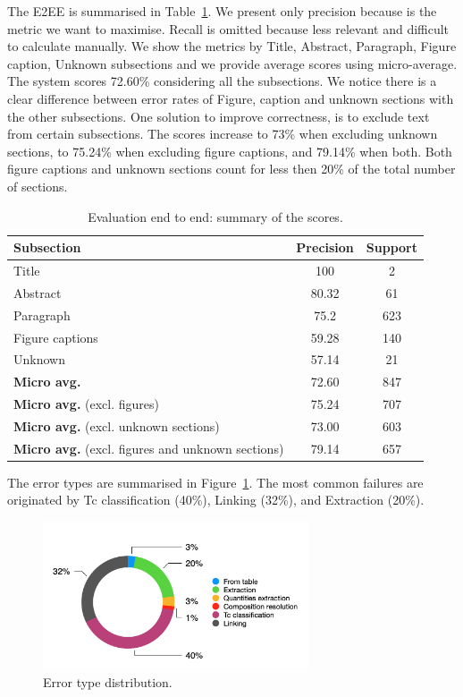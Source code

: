 \documentclass{article}
\begin{document}
The E2EE is summarised in Table~\ref{table:end2end-evaluation-summary}. 
We present only precision because is the metric we want to maximise. Recall is omitted because less relevant and difficult to calculate manually. 
We show the metrics by Title, Abstract, Paragraph, Figure caption, Unknown subsections and we provide average scores using micro-average. 
The system scores 72.60\% considering all the subsections. 
We notice there is a clear difference between error rates of Figure, caption and unknown sections with the other subsections. 
One solution to improve correctness, is to exclude text from certain subsections. 
The scores increase to 73\% when excluding unknown sections, to 75.24\% when excluding figure captions, and 79.14\%  when both. 
Both figure captions and unknown sections count for less then 20\% of the total number of sections. 


\begin{table}[ht]
\centering\small
\begin{tabular}{l c c}
\toprule
\textbf{Subsection} & \textbf{Precision} & \textbf{Support} \\ 
\midrule
Title               & 100       & 2     \\
Abstract            & 80.32     & 61    \\
Paragraph           & 75.2      & 623   \\    
Figure captions     & 59.28     & 140   \\    
Unknown             & 57.14     & 21    \\
\midrule
\textbf{Micro avg.}  & 72.60     & 847   \\
\textbf{Micro avg.} (excl. figures)  & 75.24     & 707   \\ 
\textbf{Micro avg.} (excl. unknown sections)  & 73.00     & 603   \\ 
\textbf{Micro avg.} (excl. figures and unknown sections)  & 79.14     & 657   \\ 
\bottomrule
\end{tabular}
\caption{Evaluation end to end: summary of the scores. }
\label{table:end2end-evaluation-summary}
\end{table}

The error types are summarised in Figure~\ref{fig:error-types-distribution}. The most common failures are originated by Tc classification (40\%), Linking (32\%), and Extraction (20\%).

\begin{figure}[ht!]
\centering
\includegraphics[width=0.7\textwidth]{error-type-distribution-image}
\caption{Error type distribution. }
\label{fig:error-types-distribution}
\end{figure}
\end{document}
